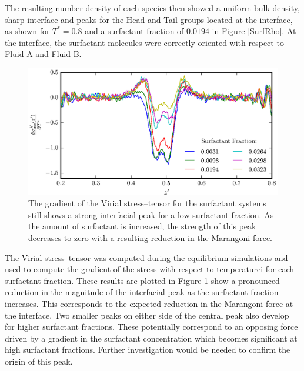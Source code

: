 The resulting number density of each species then showed a uniform bulk density, sharp interface and peaks for the Head and Tail groups located at the interface, as shown for $T^{*}=0.8$ and a surfactant fraction of $0.0194$ in Figure \ref{SurfRho}.
At the interface, the surfactant molecules were correctly oriented with respect to Fluid A and Fluid B.
\FloatBarrier

\begin{figure}[h]
\centering
\includegraphics[scale=0.8]{SurfForce}
\caption{The gradient of the Virial stress--tensor for the surfactant systems still shows a strong interfacial peak for a low surfactant fraction.
As the amount of surfactant is increased, the strength of this peak decreases to zero with a resulting reduction in the Marangoni force.
}
\label{SurfForce}
\end{figure}

The Virial stress--tensor was computed during the equilibrium simulations and used to compute the gradient of the stress with respect to temperaturei for each surfactant fraction.
These results are plotted in Figure \ref{SurfForce} show a pronounced reduction in the magnitude of the interfacial peak as the surfactant fraction increases.
This corresponds to the expected reduction in the Marangoni force at the interface.
Two smaller peaks on either side of the central peak also develop for higher surfactant fractions.
These potentially correspond to an opposing force driven by a gradient in the surfactant concentration which becomes significant at high surfactant fractions.
Further investigation would be needed to confirm the origin of this peak.
\FloatBarrier

